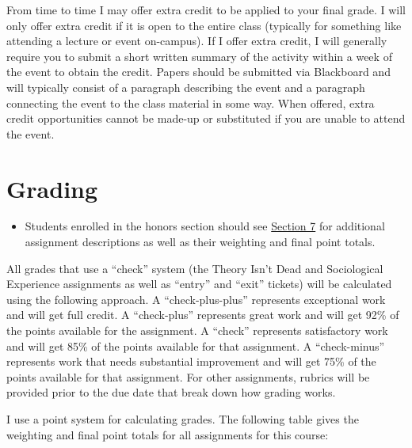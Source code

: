 \documentclass[
]{book}
\newenvironment{rmdblock}[1]
  {\begin{shaded*}
  \begin{itemize}
  \renewcommand{\labelitemi}{
    \raisebox{-.7\height}[0pt][0pt]{
      {\setkeys{Gin}{width=3em,keepaspectratio}\texttt{[image: images/\#1]}}
    }
  }
  \item
  }
  {
  \end{itemize}
  \end{shaded*}
  }
\newenvironment{rmdwarning}
  {\begin{rmdblock}{warning}}
  {\end{rmdblock}}
\begin{document}
From time to time I may offer extra credit to be applied to your final grade. I will only offer extra credit if it is open to the entire class (typically for something like attending a lecture or event on-campus). If I offer extra credit, I will generally require you to submit a short written summary of the activity within a week of the event to obtain the credit. Papers should be submitted via Blackboard and will typically consist of a paragraph describing the event and a paragraph connecting the event to the class material in some way. When offered, extra credit opportunities cannot be made-up or substituted if you are unable to attend the event.

\hypertarget{grading}{%
\section{Grading}\label{grading}}

\begin{rmdwarning}
Students enrolled in the honors section should see
\href{/syllabus/honors-overview.html}{Section 7} for additional
assignment descriptions as well as their weighting and final point
totals.
\end{rmdwarning}

All grades that use a ``check'' system (the Theory Isn't Dead and Sociological Experience assignments as well as ``entry'' and ``exit'' tickets) will be calculated using the following approach. A ``check-plus-plus'' represents exceptional work and will get full credit. A ``check-plus'' represents great work and will get 92\% of the points available for the assignment. A ``check'' represents satisfactory work and will get 85\% of the points available for that assignment. A ``check-minus'' represents work that needs substantial improvement and will get 75\% of the points available for that assignment. For other assignments, rubrics will be provided prior to the due date that break down how grading works.

I use a point system for calculating grades. The following table gives the weighting and final point totals for all assignments for this course:
\end{document}
